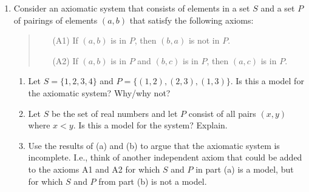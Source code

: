 \begin{exercises}{}{}
\begin{enumerate}
	
	
		\item Consider an axiomatic system that consists of elements in a set $S$ and a set $P$ of pairings of elements $(a,b)$ that satisfy the following axioms:
	  \begin{quote}
	  \begin{itemize}
	  	\item[(A1)] If $(a,b)$ is in $P$, then $(b,a)$ is not in $P$.
	  	\item[(A2)] If $(a,b)$ is in $P$ and $(b,c)$ is in $P$, then $(a,c)$ is in $P$.
	  \end{itemize}
	  \end{quote}
	  \begin{enumerate}
	    \item Let $S=\{1,2,3,4\}$ and $P=\{(1,2),(2,3),(1,3)\}$. Is this a model for the axiomatic system? Why/why not?
			\item Let $S$ be the set of real numbers and let $P$ consist of all pairs $(x,y)$ where $x<y$. Is this a model for the system? Explain.
			\item Use the results of (a) and (b) to argue that the axiomatic system is incomplete. I.e., think of another independent axiom that could be added to the axioms A1 and A2 for which $S$ and $P$ in part (a) is a model, but for which $S$ and $P$ from part (b) is not a model.
		\end{enumerate}
		

\end{enumerate}
\end{exercises}
